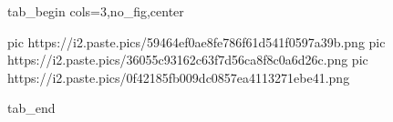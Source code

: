  
 
 
 
 


\ifcmt
  tab_begin cols=3,no_fig,center

     pic https://i2.paste.pics/59464ef0ae8fe786f61d541f0597a39b.png
		 pic https://i2.paste.pics/36055c93162c63f7d56ca8f8c0a6d26c.png
		 pic https://i2.paste.pics/0f42185fb009dc0857ea4113271ebe41.png

  tab_end
\fi
